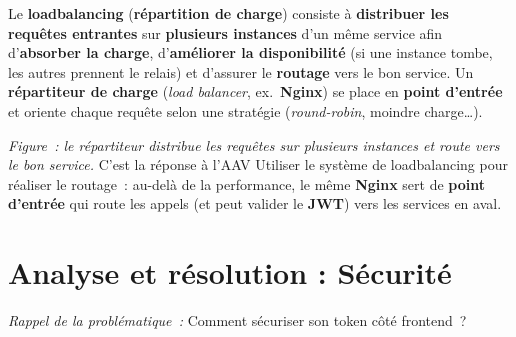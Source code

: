 \noindent Le \textbf{loadbalancing} (\textbf{répartition de charge}) consiste à \textbf{distribuer les requêtes entrantes} sur \textbf{plusieurs instances} d'un même service afin d'\textbf{absorber la charge}, d'\textbf{améliorer la disponibilité} (si une instance tombe, les autres prennent le relais) et d'assurer le \textbf{routage} vers le bon service. Un \textbf{répartiteur de charge} (\textit{load balancer}, ex.~\textbf{Nginx}) se place en \textbf{point d'entrée} et oriente chaque requête selon une stratégie (\textit{round-robin}, moindre charge…).
\begin{center}
\end{center}
\noindent\textit{Figure~: le répartiteur distribue les requêtes sur plusieurs instances et route vers le bon service.} C'est la réponse à l'AAV \og{}Utiliser le système de loadbalancing pour réaliser le routage\fg{}~: au-delà de la performance, le même \textbf{Nginx} sert de \textbf{point d'entrée} qui route les appels (et peut valider le \textbf{JWT}) vers les services en aval.

\newpage

\section*{Analyse et résolution : Sécurité}

\noindent \textit{Rappel de la problématique~:} \og{}Comment sécuriser son token côté frontend~?\fg{}

\vspace{0.3cm}

